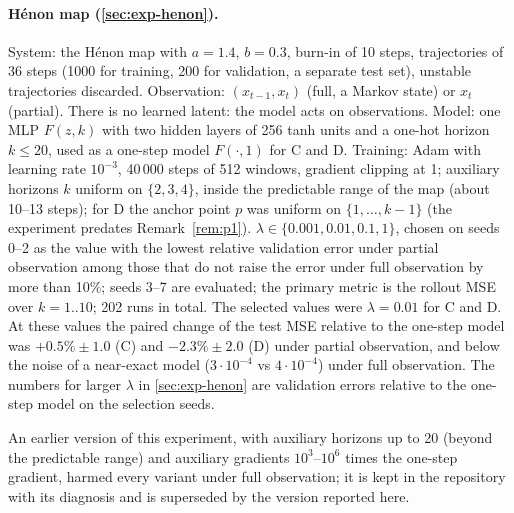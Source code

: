 \paragraph{Hénon map (\cref{sec:exp-henon}).}
System: the Hénon map with $a = 1.4$, $b = 0.3$, burn-in of 10 steps, trajectories of 36 steps (1000 for training, 200 for validation, a separate test set), unstable trajectories discarded. Observation: $(x_{t-1}, x_t)$ (full, a Markov state) or $x_t$ (partial). There is no learned latent: the model acts on observations. Model: one MLP $F(z, k)$ with two hidden layers of 256 tanh units and a one-hot horizon $k \le 20$, used as a one-step model $F(\cdot, 1)$ for C and D. Training: Adam with learning rate $10^{-3}$, 40\,000 steps of 512 windows, gradient clipping at 1; auxiliary horizons $k$ uniform on $\{2, 3, 4\}$, inside the predictable range of the map (about 10--13 steps); for D the anchor point $p$ was uniform on $\{1, \dots, k-1\}$ (the experiment predates Remark~\ref{rem:p1}). $\lambda \in \{0.001, 0.01, 0.1, 1\}$, chosen on seeds 0--2 as the value with the lowest relative validation error under partial observation among those that do not raise the error under full observation by more than 10\%; seeds 3--7 are evaluated; the primary metric is the rollout MSE over $k = 1..10$; 202 runs in total. The selected values were $\lambda = 0.01$ for C and D. At these values the paired change of the test MSE relative to the one-step model was $+0.5\% \pm 1.0$ (C) and $-2.3\% \pm 2.0$ (D) under partial observation, and below the noise of a near-exact model ($3 \cdot 10^{-4}$ vs $4 \cdot 10^{-4}$) under full observation. The numbers for larger $\lambda$ in \cref{sec:exp-henon} are validation errors relative to the one-step model on the selection seeds.

An earlier version of this experiment, with auxiliary horizons up to 20 (beyond the predictable range) and auxiliary gradients $10^3$--$10^6$ times the one-step gradient, harmed every variant under full observation; it is kept in the repository with its diagnosis and is superseded by the version reported here.

